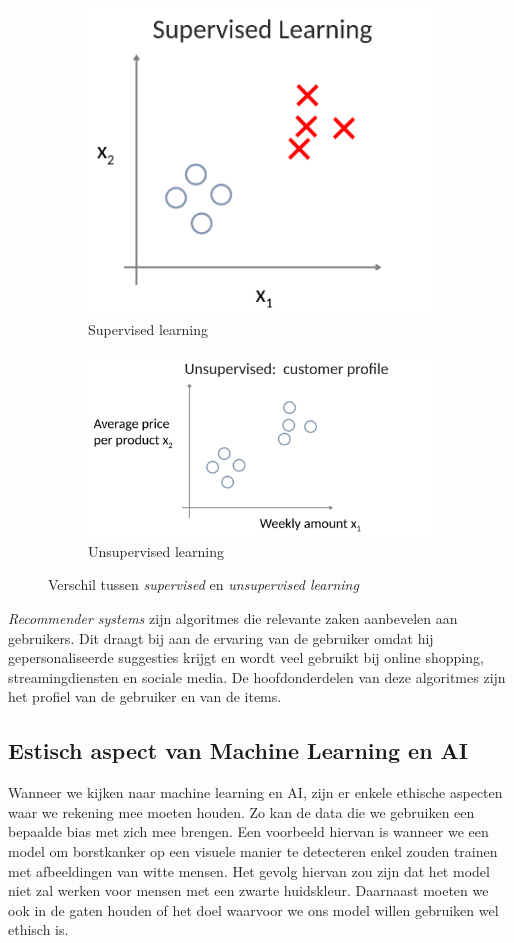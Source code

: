 \begin{figure}[h]
	\centering
	\begin{subfigure}{.5\textwidth}
		\centering
		\includegraphics[height=0.45\textwidth]{images/1-supervised-learning.png}
		\caption{Supervised learning}
		\label{fig:supervised-learning}
	\end{subfigure}%
	\begin{subfigure}{.5\textwidth}
		\centering
		\includegraphics[height=0.45\textwidth]{images/2-unsupervised-learning.png}
		\caption{Unsupervised learning}
		\label{fig:unsupervised-learning}
	\end{subfigure}
	\caption{Verschil tussen \textit{supervised} en \textit{unsupervised learning}}
	\label{fig:supervised-vs-unsupervised-learning}
\end{figure}

\noindent
\textit{Recommender systems} zijn algoritmes die relevante zaken aanbevelen aan gebruikers. Dit draagt bij aan de ervaring van de gebruiker omdat hij gepersonaliseerde suggesties krijgt en wordt veel gebruikt bij online shopping, streamingdiensten en sociale media. De hoofdonderdelen van deze algoritmes zijn het profiel van de gebruiker en van de items.

\subsection{Estisch aspect van Machine Learning en AI}

Wanneer we kijken naar machine learning en AI, zijn er enkele ethische aspecten waar we rekening mee moeten houden. Zo kan de data die we gebruiken een bepaalde bias met zich mee brengen. Een voorbeeld hiervan is wanneer we een model om borstkanker op een visuele manier te detecteren enkel zouden trainen met afbeeldingen van witte mensen. Het gevolg hiervan zou zijn dat het model niet zal werken voor mensen met een zwarte huidskleur. Daarnaast moeten we ook in de gaten houden of het doel waarvoor we ons model willen gebruiken wel ethisch is. 
\newpage

